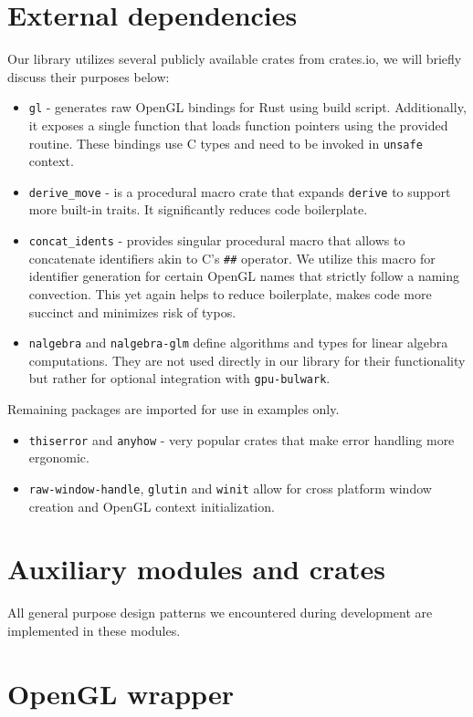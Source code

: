\section{External dependencies}
%
Our library utilizes several publicly available crates from crates.io, we will briefly discuss their purposes below:
\begin{itemize}
    \item \texttt{gl} - generates raw OpenGL bindings for Rust using build script. Additionally, it exposes a single function that loads function pointers using the provided routine. 
    These bindings use C types and need to be invoked in \texttt{unsafe} context.
    \item \texttt{derive\_move} - is a procedural macro crate that expands \texttt{derive} to support more built-in traits. It significantly reduces code boilerplate.
    \item \texttt{concat\_idents} - provides singular procedural macro that allows to concatenate identifiers akin to C's \texttt{\#\#} operator. We utilize this macro for identifier generation for certain OpenGL names that strictly follow a naming convection. This yet again helps to reduce boilerplate, makes code more succinct and minimizes risk of typos.
    \item \texttt{nalgebra} and \texttt{nalgebra-glm} define algorithms and types for linear algebra computations. They are not used directly in our library for their functionality but rather for optional integration with \texttt{gpu-bulwark}.
\end{itemize}
Remaining packages are imported for use in examples only.
%
\begin{itemize}
    \item \texttt{thiserror} and \texttt{anyhow} - very popular crates that make error handling more ergonomic.
    \item \texttt{raw-window-handle}, \texttt{glutin} and \texttt{winit} allow for cross platform window creation and OpenGL context initialization.
\end{itemize}

\section{Auxiliary modules and crates}

All general purpose design patterns we encountered during development are implemented in these modules.

\section{OpenGL wrapper}
